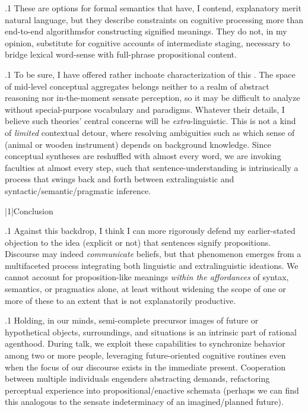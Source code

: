 \documentclass[11pt, twocolumn]{article}
\begin{document}
\p.1{%
\:\+These are options for formal semantics that have, I contend,
explanatory merit \visavis{} natural language, but they describe
constraints on cognitive processing more than end-to-end
algorithmsfor constructing signified meanings. \> 
They do not, in my opinion, substitute for cognitive
accounts of intermediate staging, necessary
to bridge lexical word-sense with full-phrase propositional content.\<\;
}%

\p.1{%
\:\+To be sure, I have offered rather inchoate characterization
of this . \>  The space of mid-level conceptual
aggregates belongs neither to a realm of abstract reasoning nor
in-the-moment sensate perception, so it may be difficult to
analyze without special-purpose vocabulary and paradigms. \> 
Whatever their details, I believe such theories' central
concerns will be \textit{extra}-linguistic. \>  This is not a kind
of \textit{limited} contextual detour, where resolving
ambiguities such as which sense of  (animal or wooden instrument) depends on
background knowledge. \>  Since conceptual syntheses are
reshuffled with almost every word, we are
invoking  faculties at almost every
step, such that sentence-understanding is intrinsically a
process that swings back and forth between
extralinguistic and syntactic/semantic/pragmatic
inference.\vspace{4pt}\enlargethispage{5pt}\<\;
}%


\s|1|{Conclusion}

\p.1{%
\:\+Against this backdrop, I think I can more rigorously
defend my earlier-stated objection to the
idea (explicit or not) that sentences signify propositions. \> 
Discourse may indeed \textit{communicate} beliefs,
but that phenomenon emerges from a multifaceted
process integrating both linguistic and extralinguistic
ideations. \>  We cannot account for proposition-like
meanings \textit{within the affordances} of syntax, semantics,
or pragmatics alone, at least without widening the scope
of one or more of these to an extent that is not explanatorily
productive.\<\;
}%

\p.1{%
\:\+Holding, in our minds, semi-complete precursor images of
future or hypothetical objects, surroundings, and
situations is an intrinsic part of rational agenthood. \> 
During talk, we exploit these capabilities
to synchronize behavior among two or more people,
leveraging future-oriented cognitive routines even
when the focus of our discourse exists in the immediate
present. \>  Cooperation between multiple individuals engenders
abstracting demands, refactoring perceptual experience
into propositional/enactive schemata (perhaps we can find this
analogous to the sensate indeterminacy
of an imagined/planned future).\<\;
}%
\end{document}

